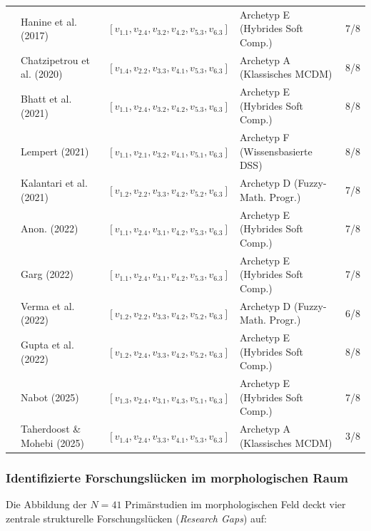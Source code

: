 \begin{longtable}{p{} p{} p{} p{} p{}}
\cite{NZJEEPAC} & Hanine et al. (2017) & $[v_{1.1}, v_{2.4}, v_{3.2}, v_{4.2}, v_{5.3}, v_{6.3}]$ & Archetyp E (Hybrides Soft Comp.) & 7/8 \\
\cite{UK2X9C4W} & Chatzipetrou et al. (2020) & $[v_{1.4}, v_{2.2}, v_{3.3}, v_{4.1}, v_{5.3}, v_{6.3}]$ & Archetyp A (Klassisches MCDM) & 8/8 \\
\cite{5BBYQCJB} & Bhatt et al. (2021) & $[v_{1.1}, v_{2.4}, v_{3.2}, v_{4.2}, v_{5.3}, v_{6.3}]$ & Archetyp E (Hybrides Soft Comp.) & 8/8 \\
\cite{RRU375GB} & Lempert (2021) & $[v_{1.1}, v_{2.1}, v_{3.2}, v_{4.1}, v_{5.1}, v_{6.3}]$ & Archetyp F (Wissensbasierte DSS) & 8/8 \\
\cite{UFCEV52H} & Kalantari et al. (2021) & $[v_{1.2}, v_{2.2}, v_{3.3}, v_{4.2}, v_{5.2}, v_{6.3}]$ & Archetyp D (Fuzzy-Math. Progr.) & 7/8 \\
\cite{9BLXY3EP} & Anon. (2022) & $[v_{1.1}, v_{2.4}, v_{3.1}, v_{4.2}, v_{5.3}, v_{6.3}]$ & Archetyp E (Hybrides Soft Comp.) & 7/8 \\
\cite{FVINCQ89} & Garg (2022) & $[v_{1.1}, v_{2.4}, v_{3.1}, v_{4.2}, v_{5.3}, v_{6.3}]$ & Archetyp E (Hybrides Soft Comp.) & 7/8 \\
\cite{8KF4HAZS} & Verma et al. (2022) & $[v_{1.2}, v_{2.2}, v_{3.3}, v_{4.2}, v_{5.2}, v_{6.3}]$ & Archetyp D (Fuzzy-Math. Progr.) & 6/8 \\
\cite{YVWGHAWQ} & Gupta et al. (2022) & $[v_{1.2}, v_{2.4}, v_{3.3}, v_{4.2}, v_{5.2}, v_{6.3}]$ & Archetyp E (Hybrides Soft Comp.) & 8/8 \\
\cite{LNQHES84} & Nabot (2025) & $[v_{1.3}, v_{2.4}, v_{3.1}, v_{4.3}, v_{5.1}, v_{6.3}]$ & Archetyp E (Hybrides Soft Comp.) & 7/8 \\
\cite{LPC92LAP} & Taherdoost \& Mohebi (2025) & $[v_{1.4}, v_{2.4}, v_{3.3}, v_{4.1}, v_{5.3}, v_{6.3}]$ & Archetyp A (Klassisches MCDM) & 3/8 \\
\end{longtable}

\subsubsection{Identifizierte Forschungslücken im morphologischen Raum}

Die Abbildung der $N = 41$ Primärstudien im morphologischen Feld deckt vier zentrale strukturelle Forschungslücken (\textit{Research Gaps}) auf:

